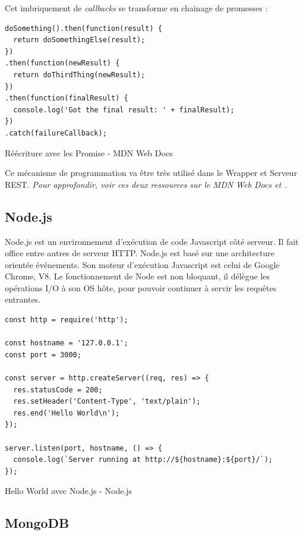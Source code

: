 \documentclass[a4paper, 12pt]{article}
\newenvironment{code}{\captionsetup{type=listing}}{}
\begin{document}
Cet imbriquement de \textit{callbacks} se transforme en chainage de promesses : \\
\begin{code}
    \begin{verbatim}
doSomething().then(function(result) {
  return doSomethingElse(result);
})
.then(function(newResult) {
  return doThirdThing(newResult);
})
.then(function(finalResult) {
  console.log('Got the final result: ' + finalResult);
})
.catch(failureCallback);
    \end{verbatim}
    \caption{Réécriture avec les Promise - MDN Web Docs \cite{ref102}}
\end{code}
Ce mécanisme de programmation va être très utilisé dans le Wrapper et Serveur REST.
\textit{Pour approfondir, voir ces deux ressources sur le MDN Web Docs \cite{ref100} et \cite{ref102}.}

\subsection{Node.js}
Node.js est un environnement d'exécution de code Javascript côté serveur. Il fait office entre autres de serveur HTTP.
Node.js est basé sur une architecture orientée événements. Son moteur d'exécution Javascript est celui de Google Chrome, V8. 
Le fonctionnement de Node est non bloquant, il délègue les opérations I/O à son OS hôte, pour pouvoir continuer à servir 
les requêtes entrantes.
\begin{code}
    \begin{verbatim}
const http = require('http');

const hostname = '127.0.0.1';
const port = 3000;

const server = http.createServer((req, res) => {
  res.statusCode = 200;
  res.setHeader('Content-Type', 'text/plain');
  res.end('Hello World\n');
});

server.listen(port, hostname, () => {
  console.log(`Server running at http://${hostname}:${port}/`);
});
    \end{verbatim}
    \caption{Hello World avec Node.js - Node.js \cite{ref170}}
\end{code}

\subsection{MongoDB}
\end{document}
